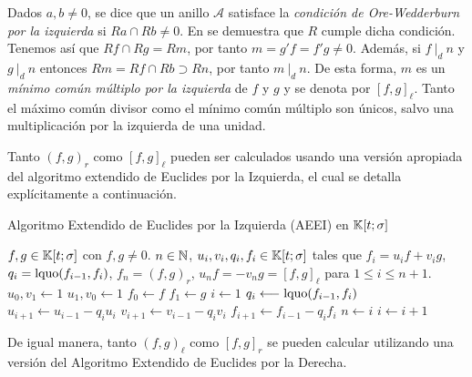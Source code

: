 Dados $a,b \neq 0$, se dice que un anillo $\mathcal{A}$ satisface la \emph{condición de Ore-Wedderburn por la izquierda} si $Ra \cap Rb \neq 0$. En \cite[p.4]{jacobson1996} se demuestra que $R$ cumple dicha condición. Tenemos así que $Rf \cap Rg = Rm$, por tanto $m = g'f = f'g \neq 0$. Además, si $f \ |_d \ n$ y $g \ |_d \ n$ entonces $Rm = Rf \cap Rb \supset Rn$, por tanto $m \ |_d \ n$. De esta forma, $m$ es un \emph{mínimo común múltiplo por la izquierda} de $f$ y $g$ y se denota por $[f,g]_\ell$. Tanto el máximo común divisor como el mínimo común múltiplo son únicos, salvo una multiplicación por la izquierda de una unidad.

Tanto $(f,g)_r$ como $[f,g]_\ell$ pueden ser calculados usando una versión apropiada del algoritmo extendido de Euclides por la Izquierda, el cual se detalla explícitamente a continuación.

\begin{algorithm}[h]
    \caption{Algoritmo Extendido de Euclides por la Izquierda (AEEI) en $\mathbb{K}[t;\sigma]$}
    \begin{algorithmic}[1]
    \REQUIRE $f,g \in \mathbb{K}[t;\sigma]$ con $f,g \neq 0$.
    \ENSURE $n \in \mathbb{N}$, $u_i,v_i,q_i,f_i \in \mathbb{K}[t;\sigma]$ tales que $f_i = u_if + v_ig$, $q_i = \text{lquo}(f_{i-1},f_i)$, $f_n = (f,g)_r$, $u_nf = -v_ng = [f,g]_\ell$ para $1 \leq i \leq n + 1$. 
    \STATE $u_0,v_1 \longleftarrow 1$
    \STATE $u_1,v_0 \longleftarrow 1$
    \STATE $f_0 \longleftarrow f$
    \STATE $f_1 \longleftarrow g$
    \STATE $i \longleftarrow 1$
    \STATE $q_i \longleftarrow \text{lquo}(f_{i-1},f_i)$
    \STATE $u_{i+1} \longleftarrow u_{i-1} - q_iu_i$
    \STATE $v_{i+1} \longleftarrow v_{i-1} - q_iv_i$
    \STATE $f_{i+1} \longleftarrow f_{i-1} - q_if_i$
    \STATE $n \longleftarrow i$
    \STATE $i \longleftarrow i + 1$

    \ENDWHILE
    \end{algorithmic}
\end{algorithm}

De igual manera, tanto $(f,g)_\ell$ como $[f,g]_r$ se pueden calcular utilizando una versión del Algoritmo Extendido de Euclides por la Derecha. 

